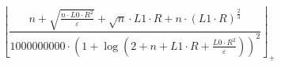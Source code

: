 \[\left\lfloor \frac{n + \sqrt{\frac{n \cdot L0 \cdot R^{2}}{\varepsilon}} + \sqrt{n} \cdot L1 \cdot R + n \cdot \left(L1 \cdot R\right)^{\frac{2}{3}}}{1000000000 \cdot \left(1 + \log\left(2 + n + L1 \cdot R + \frac{L0 \cdot R^{2}}{\varepsilon}\right)\right)^{2}} \right\rfloor_{+}\]

